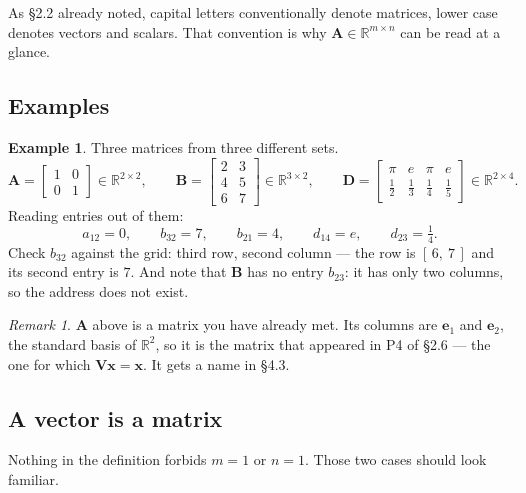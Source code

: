 \documentclass[11pt]{article}
\theoremstyle{plain}
\theoremstyle{definition}
\newtheorem{ex}{Example}[section]
\theoremstyle{remark}
\newtheorem*{rmk}{Remark}
\newcommand{\R}{\mathbb{R}}
\newcommand{\vc}[1]{\mathbf{#1}}        %
\newcommand{\mt}[1]{\mathbf{#1}}        %
\begin{document}
\noindent As \S2.2 already noted, capital letters conventionally denote
matrices, lower case denotes vectors and scalars. That convention is why
$\mt{A}\in\R^{m\times n}$ can be read at a glance.

\subsection{Examples}
\begin{ex}
Three matrices from three different sets.
\[
  \mt{A}=\begin{bmatrix}1&0\\0&1\end{bmatrix}\in\R^{2\times2},
  \qquad
  \mt{B}=\begin{bmatrix}2&3\\4&5\\6&7\end{bmatrix}\in\R^{3\times2},
  \qquad
  \mt{D}=\begin{bmatrix}
    \pi & e & \pi & e\\[2pt]
    \tfrac12 & \tfrac13 & \tfrac14 & \tfrac15
  \end{bmatrix}\in\R^{2\times4} .
\]
Reading entries out of them:
\[
  a_{12}=0,\qquad
  b_{32}=7,\qquad
  b_{21}=4,\qquad
  d_{14}=e,\qquad
  d_{23}=\tfrac14 .
\]
Check $b_{32}$ against the grid: third row, second column --- the row is
$[\,6,\ 7\,]$ and its second entry is $7$. And note that $\mt{B}$ has no entry
$b_{23}$: it has only two columns, so the address does not exist.
\end{ex}

\begin{rmk}
$\mt{A}$ above is a matrix you have already met. Its columns are $\vc{e}_1$ and
$\vc{e}_2$, the standard basis of $\R^{2}$, so it is the matrix that appeared in
P4 of \S2.6 --- the one for which $\mt{V}\vc{x}=\vc{x}$. It gets a name in
\S4.3.
\end{rmk}

\subsection{A vector is a matrix}
Nothing in the definition forbids $m=1$ or $n=1$. Those two cases should look
familiar.
\end{document}
